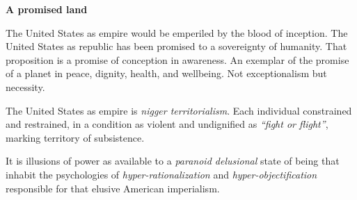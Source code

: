 

{\bf A promised land}

The United States as empire would be emperiled by the blood of
inception.  The United States as republic has been promised to a
sovereignty of humanity.  That proposition is a promise of conception
in awareness.  An exemplar of the promise of a planet in peace,
dignity, health, and wellbeing.  Not exceptionalism but necessity.

The United States as empire is {\it nigger territorialism}.  Each
individual constrained and restrained, in a condition as violent and
undignified as {\it ``fight or flight''}, marking territory of
subsistence.

It is illusions of power as available to a {\it paranoid delusional}
state of being that inhabit the psychologies of {\it
hyper-rationalization} and {\it hyper-objectification} responsible for
that elusive American imperialism.

\bye
